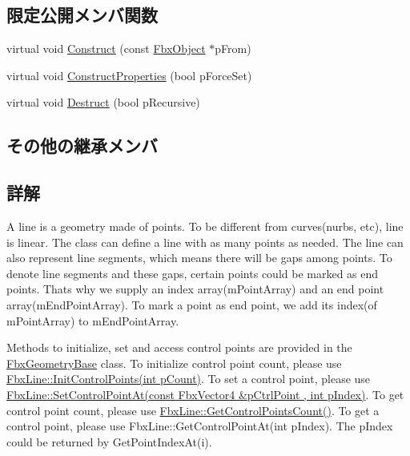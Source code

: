 \subsection*{限定公開メンバ関数}
\begin{DoxyCompactItemize}
\item 
virtual void \hyperlink{class_fbx_line_a42d7e3fb4684712df04464644abee11a}{Construct} (const \hyperlink{class_fbx_object}{Fbx\+Object} $\ast$p\+From)
\item 
virtual void \hyperlink{class_fbx_line_a48df4b6cd889814d3fe7ca5bb09bcc78}{Construct\+Properties} (bool p\+Force\+Set)
\item 
virtual void \hyperlink{class_fbx_line_a92abd64f6b58057c899bf5733a2e2275}{Destruct} (bool p\+Recursive)
\end{DoxyCompactItemize}
\subsection*{その他の継承メンバ}


\subsection{詳解}
A line is a geometry made of points. To be different from curves(nurbs, etc), line is linear. The class can define a line with as many points as needed. The line can also represent line segments, which means there will be gaps among points. To denote line segments and these gaps, certain points could be marked as end points. That\textquotesingle{}s why we supply an index array(m\+Point\+Array) and an end point array(m\+End\+Point\+Array). To mark a point as end point, we add its index(of m\+Point\+Array) to m\+End\+Point\+Array.

Methods to initialize, set and access control points are provided in the \hyperlink{class_fbx_geometry_base}{Fbx\+Geometry\+Base} class. To initialize control point count, please use \hyperlink{class_fbx_geometry_base_a471b736f2595c006a338c07a61907127}{Fbx\+Line\+::\+Init\+Control\+Points(int p\+Count)}. To set a control point, please use \hyperlink{class_fbx_geometry_base_ab2d5567b073e6b9f4feb5bb428fa99e4}{Fbx\+Line\+::\+Set\+Control\+Point\+At(const Fbx\+Vector4 \&p\+Ctrl\+Point , int p\+Index)}. To get control point count, please use \hyperlink{class_fbx_geometry_base_aa9f42ae6a958036722670143fabf3b17}{Fbx\+Line\+::\+Get\+Control\+Points\+Count()}. To get a control point, please use Fbx\+Line\+::\+Get\+Control\+Point\+At(int p\+Index). The p\+Index could be returned by Get\+Point\+Index\+At(i). 

